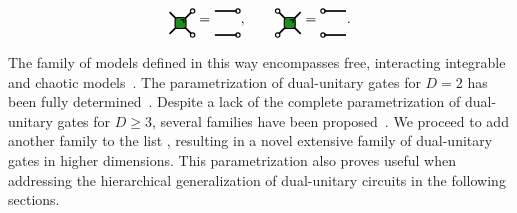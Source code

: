 \documentclass[aps,prx,twocolumn,notitlepage,nofootinbib,nobalancelastpage]{revtex4-2}
\theoremstyle{break}
\newcommand{\1}{\mathbbm{1}}
\theoremstyle{plain}
\theoremstyle{plain}
\theoremstyle{plain}
\newcommand{\Wgategreen}[2]{
\draw[very thick] (#1-0.5, #2 +0.5) -- (#1+0.5,#2-0.5);
\draw[very thick] (#1-0.5,#2-0.5) -- (#1+0.5,#2+0.5);
\draw[ thick, fill=mygreen, rounded corners=2pt] (#1-0.25,#2+0.25) rectangle (#1+0.25,#2-0.25);
\draw[thick] (#1,#2+0.15) -- (#1+0.15,#2+0.15) -- (#1+0.15,#2);
}
\newcommand{\MYcircle}[2]{
\draw[thick, fill=white] (#1,#2) circle (0.1cm); }
\begin{document}
\begin{equation}
\begin{tikzpicture}[baseline=(current  bounding  box.center), scale=0.55]
\Wgategreen{0}{0}
\MYcircle{0.55}{0.55}
\MYcircle{0.55}{-0.55}
\end{tikzpicture}
=
\begin{tikzpicture}[baseline=(current  bounding  box.center), scale=0.55]
\MYcircle{0.55}{0.55}
\MYcircle{0.55}{-0.55}
\draw[very thick] (-0.5,0.55) -- (0.5,0.55);
\draw[very thick] (-0.5,-0.55) -- (0.5,-0.55);
\end{tikzpicture}
,
\qquad
\begin{tikzpicture}[baseline=(current  bounding  box.center), scale=0.55]
\Wgategreen{0}{0}
\MYcircle{-0.55}{0.55}
\MYcircle{-0.55}{-0.55}
\end{tikzpicture}
=
\begin{tikzpicture}[baseline=(current  bounding  box.center), scale=0.55]
\MYcircle{-0.55}{0.55}
\MYcircle{-0.55}{-0.55}
\draw[very thick] (-0.5,0.55) -- (0.5,0.55);
\draw[very thick] (-0.5,-0.55) -- (0.5,-0.55);
\end{tikzpicture}
. \label{eq:figure_dual_unitary_condi}
\end{equation}

The family of models defined in this way encompasses free, interacting integrable and chaotic models~\cite{bertini2019exact}. The parametrization of dual-unitary gates for $D=2$
has been fully determined~\cite{bertini2019exact}.
Despite a lack of the complete parametrization of dual-unitary gates for $D\geq3$, several families have been proposed~\cite{rather2020creating, gutkin2020exact, claeys2021ergodic, aravinda2021from,prosen2021manybody, marton2022construction}. 
We proceed to add another family to the list%
, resulting in a novel extensive family of dual-unitary gates in higher dimensions. This parametrization
also proves useful when addressing the hierarchical generalization
of dual-unitary circuits in the following sections.
\end{document}
